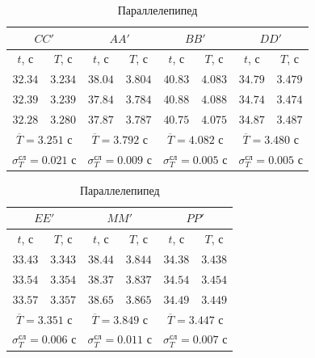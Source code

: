 \documentclass[a4paper,12pt]{article}
\begin{document}
\begin{enumerate}
    \begin{table}[!h]
        \centering
        \begin{tabular}{|c|c|c|c|c|c|c|c|} \hline
            \multicolumn{2}{|c}{$CC'$}  & \multicolumn{2}{|c}{$AA'$}  & \multicolumn{2}{|c}{$BB'$} & \multicolumn{2}{|c|}{$DD'$} \\ \hline
            $t$, с  & $T$, с  & $t$, с  & $T$, с  & $t$, с  & $T$, с  & $t$, с  & $T$, с  \\ \hline
            $32.34$ & $3.234$ & $38.04$ & $3.804$ & $40.83$ & $4.083$ & $34.79$ & $3.479$ \\ \hline
            $32.39$ & $3.239$ & $37.84$ & $3.784$ & $40.88$ & $4.088$ & $34.74$ & $3.474$ \\ \hline
            $32.28$ & $3.280$ & $37.87$ & $3.787$ & $40.75$ & $4.075$ & $34.87$ & $3.487$ \\ \hline
            \multicolumn{2}{|c|}{$\overline{T} = 3.251$ с} & \multicolumn{2}{|c|}{$\overline{T} = 3.792$ с} & \multicolumn{2}{|c|}{$\overline{T} = 4.082$ с} & \multicolumn{2}{|c|}{$\overline{T} = 3.480$ с} \\ 
            \multicolumn{2}{|c|}{$\sigma_T^{\text{сл}} = 0.021$ с} & \multicolumn{2}{|c|}{$\sigma_T^{\text{сл}} = 0.009$ с} & \multicolumn{2}{|c|}{$\sigma_T^{\text{сл}} = 0.005$ с} & \multicolumn{2}{|c|}{$\sigma_T^{\text{сл}} = 0.005$ с} \\ \hline
        \end{tabular}
        \caption{Параллелепипед}
    \end{table}
    \begin{table}[!h]
        \centering
        \begin{tabular}{|c|c|c|c|c|c|} \hline
            \multicolumn{2}{|c}{$EE'$} & \multicolumn{2}{|c}{$MM'$} & \multicolumn{2}{|c|}{$PP'$} \\ \hline
            $t$, с  & $T$, с  & $t$, с  & $T$, с  & $t$, с  & $T$, с  \\ \hline
            $33.43$ & $3.343$ & $38.44$ & $3.844$ & $34.38$ & $3.438$ \\ \hline
            $33.54$ & $3.354$ & $38.37$ & $3.837$ & $34.54$ & $3.454$ \\ \hline
            $33.57$ & $3.357$ & $38.65$ & $3.865$ & $34.49$ & $3.449$ \\ \hline
            \multicolumn{2}{|c|}{$\overline{T} = 3.351$ с} & \multicolumn{2}{|c|}{$\overline{T} = 3.849$ с} & \multicolumn{2}{|c|}{$\overline{T} = 3.447$ с} \\ 
            \multicolumn{2}{|c|}{$\sigma_T^{\text{сл}} = 0.006$ с} & \multicolumn{2}{|c|}{$\sigma_T^{\text{сл}} = 0.011$ с} & \multicolumn{2}{|c|}{$\sigma_T^{\text{сл}} = 0.007$ с} \\ \hline
        \end{tabular}
        \caption{Параллелепипед}
    \end{table}


\end{enumerate}
\end{document}
